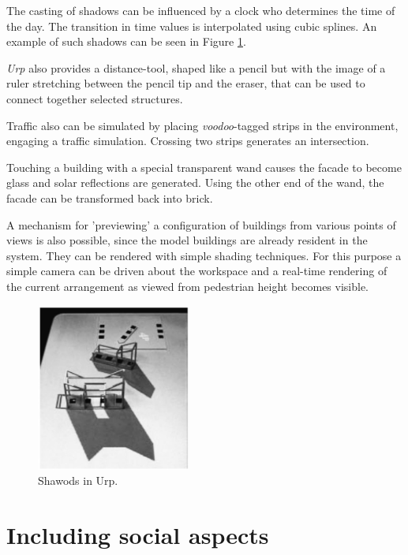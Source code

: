 The casting of shadows can be influenced by a clock who determines the time of the day. The transition in time values is interpolated using cubic splines. An example of such shadows can be seen in Figure \ref{fig:urp2}.

\textit{Urp} also provides a distance-tool, shaped like a pencil but with the image of a ruler stretching between the pencil tip and the eraser, that can be used to connect together selected structures. 

Traffic also can be simulated by placing \textit{voodoo}-tagged strips in the environment, engaging a traffic simulation. Crossing two strips generates an intersection. 

Touching a building with a special transparent wand causes the facade to become glass and solar reflections are generated. Using the other end of the wand, the facade can be transformed back into brick. 

A mechanism for 'previewing' a configuration of buildings from various points of views is also possible, since the model buildings are already resident in the system. They can be rendered with simple shading techniques. For this purpose a simple camera can be driven about the workspace and a real-time rendering of the current arrangement as viewed from pedestrian height becomes visible. 

\begin{figure}
\centering
\includegraphics[width=0.45\textwidth]{figures/urp-shadow.jpg}
\caption{Shawods in Urp.}
\label{fig:urp2}
\end{figure}





\section{Including social aspects}

